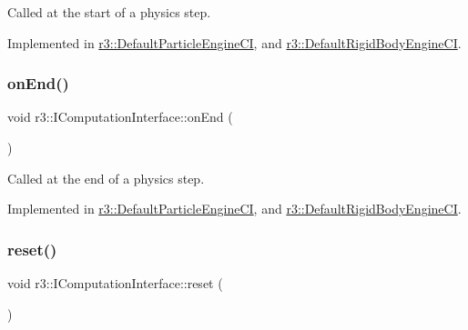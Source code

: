 Called at the start of a physics step. 



Implemented in \mbox{\hyperlink{classr3_1_1_default_particle_engine_c_i_aaf2e9ca87bff5e48c8eb59384e9cf180}{r3\+::\+Default\+Particle\+Engine\+CI}}, and \mbox{\hyperlink{classr3_1_1_default_rigid_body_engine_c_i_a5d9e40ea40845499f01081d21cd9ff64}{r3\+::\+Default\+Rigid\+Body\+Engine\+CI}}.

\mbox{\label{classr3_1_1_i_computation_interface_acae0c5fada7e414c74fe6f5a8f4a6c7d}} 
\subsubsection{\texorpdfstring{on\+End()}{onEnd()}}
{\footnotesize\ttfamily void r3\+::\+I\+Computation\+Interface\+::on\+End (\begin{DoxyParamCaption}{ }\end{DoxyParamCaption})\hspace{0.3cm}{\ttfamily [pure virtual]}}



Called at the end of a physics step. 



Implemented in \mbox{\hyperlink{classr3_1_1_default_particle_engine_c_i_a6a34c77436d8133560eaa7366c740119}{r3\+::\+Default\+Particle\+Engine\+CI}}, and \mbox{\hyperlink{classr3_1_1_default_rigid_body_engine_c_i_ad7746126ebd5aab4cfc352dd9facabb2}{r3\+::\+Default\+Rigid\+Body\+Engine\+CI}}.

\mbox{\label{classr3_1_1_i_computation_interface_a6069989c54ffd4e714788d0968851007}} 
\subsubsection{\texorpdfstring{reset()}{reset()}}
{\footnotesize\ttfamily void r3\+::\+I\+Computation\+Interface\+::reset (\begin{DoxyParamCaption}{ }\end{DoxyParamCaption})\hspace{0.3cm}{\ttfamily [pure virtual]}}



